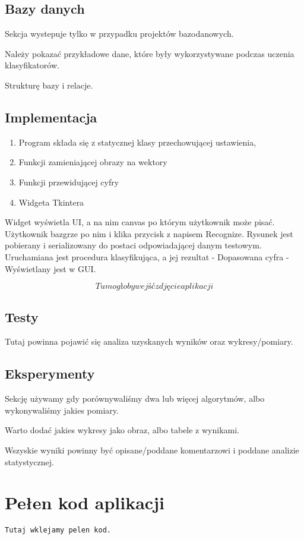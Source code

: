 \documentclass[12pt,a4paper]{article}
\begin{document}
	\subsection*{Bazy danych}
	Sekcja wystepuje tylko w przypadku projektów bazodanowych.
	
	Należy pokazać przykładowe dane, które były wykorzystywane podczas uczenia klasyfikatorów.
	
	Strukturę bazy i relacje.
	\subsection*{Implementacja}
    \begin{enumerate}
        \item Program składa się z statycznej klasy przechowującej ustawienia, 
        \item Funkcji zamieniającej obrazy na wektory
        \item Funkcji przewidującej cyfry
        \item Widgeta Tkintera
    \end{enumerate}
    
    Widget wyświetla UI, a na nim canvas po którym użytkownik może pisać.
    Użytkownik bazgrze po nim i klika przycisk z napisem Recognize. Rysunek jest pobierany i serializowany do postaci odpowiadającej danym testowym. Uruchamiana jest procedura klasyfikująca, a jej rezultat - Dopasowana cyfra - Wyświetlany jest w GUI.
    
    \[ Tu mogło by wejść zdjęcie aplikacji \]

	\subsection*{Testy}
	Tutaj powinna pojawić się analiza uzyskanych wyników oraz wykresy/pomiary.
	
	\subsection*{Eksperymenty}
	Sekcję używamy gdy porównywaliśmy dwa lub więcej algorytmów, albo wykonywaliśmy jakies pomiary.
	
	Warto dodać jakies wykresy jako obraz, albo tabele z wynikami. 
	
	Wszyskie wyniki powinny być opisane/poddane komentarzowi i poddane analizie statystycznej.
	\newpage
	\section*{Pełen kod aplikacji}
\begin{lstlisting}
Tutaj wklejamy pelen kod. 
\end{lstlisting}
\end{document}
